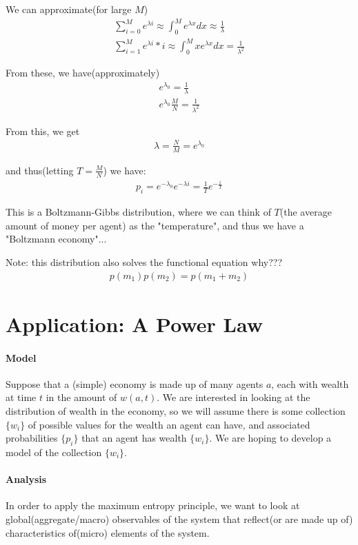 \documentclass[10 pt,final]{article}
\newcommand{\impo}[1]{{\color{magenta} #1}}
\newcommand{\question}[1]{{\color{blue} #1}}
\begin{document}
We can approximate(for large $M$)
\begin{align*}
\sum^M_{i=0} e^{\lambda i} \approx \int_0^M e^{\lambda x} dx \approx \frac{1}{\lambda} \\
\sum^M_{i=1} e^{\lambda i} *i \approx \int_0^M x e^{\lambda x} dx = \frac{1}{\lambda^2}
\end{align*}

From these, we have(approximately)
\begin{align*}
e^{\lambda_0} = \frac{1}{\lambda} \\
e^{\lambda_0} \frac{M}{N} = \frac{1}{\lambda^2}
\end{align*}

From this, we get
\begin{align*}
\lambda = \frac{N}{M} = e^{\lambda_0}
\end{align*}

and thus(letting $T=\frac{M}{N}$) we have:
\begin{align*}
p_i = e^{-\lambda_0}e^{-\lambda i} = \frac{1}{T} e^{-\frac{i}{T}}
\end{align*}

This is a \impo{Boltzmann-Gibbs} distribution, where we can think of $T$(the average amount of money per agent) as the "temperature", and thus we have a "Boltzmann economy"...

Note: this distribution also solves the functional equation \question{why???}
\begin{align*}
p(m_1) p(m_2) = p(m_1 + m_2)
\end{align*}

\section{Application: A Power Law}
\paragraph{Model} Suppose that a (simple) economy is made up of many agents $a$, each with wealth at time $t$ in the amount of $w(a,t)$. We are interested in looking at the distribution of wealth in the economy, so we will assume there is some collection $\{w_i\}$ of possible values for the wealth an agent can have, and associated probabilities $\{p_i\}$ that an agent has wealth $\{w_i\}$. We are hoping to develop a model of the collection $\{w_i\}$.

\paragraph{Analysis} In order to apply the \impo{maximum entropy principle}, we want to look at global(aggregate/macro) observables of the system that reflect(or are made up of) characteristics of(micro) elements of the system. 
\end{document}
